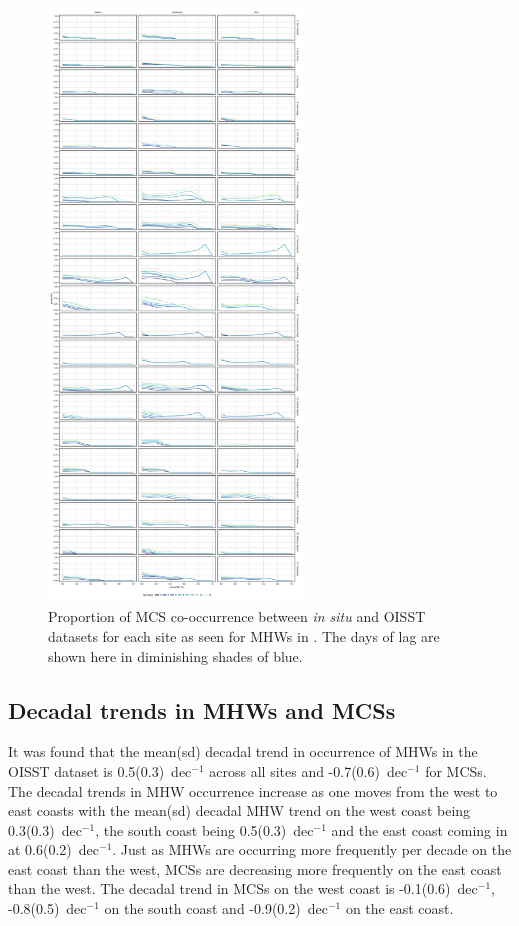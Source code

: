 \documentclass[a4paper,10pt,review]{elsarticle}
\begin{document}
\begin{figure}
\centering \includegraphics[width=0.6\textwidth]{figure5.pdf}
\caption{Proportion of MCS co-occurrence between \emph{in situ} and OISST datasets for each site as seen for MHWs in . The days of lag are shown here in diminishing shades of blue.} \label{fig:Figure5}
\end{figure}

\subsection{Decadal trends in MHWs and MCSs}
It was found that the mean(sd) decadal trend in occurrence of MHWs in the OISST dataset is 0.5(0.3)~dec$^{-1}$ across all sites and -0.7(0.6)~dec$^{-1}$ for MCSs. The decadal trends in MHW occurrence increase as one moves from the west to east coasts with the mean(sd) decadal MHW trend on the west coast being 0.3(0.3)~dec$^{-1}$, the south coast being 0.5(0.3)~dec$^{-1}$ and the east coast coming in at 0.6(0.2)~dec$^{-1}$. Just as MHWs are occurring more frequently per decade on the east coast than the west, MCSs are decreasing more frequently on the east coast than the west. The decadal trend in MCSs on the west coast is -0.1(0.6)~dec$^{-1}$, -0.8(0.5)~dec$^{-1}$ on the south coast and -0.9(0.2)~dec$^{-1}$ on the east coast.
\end{document}
